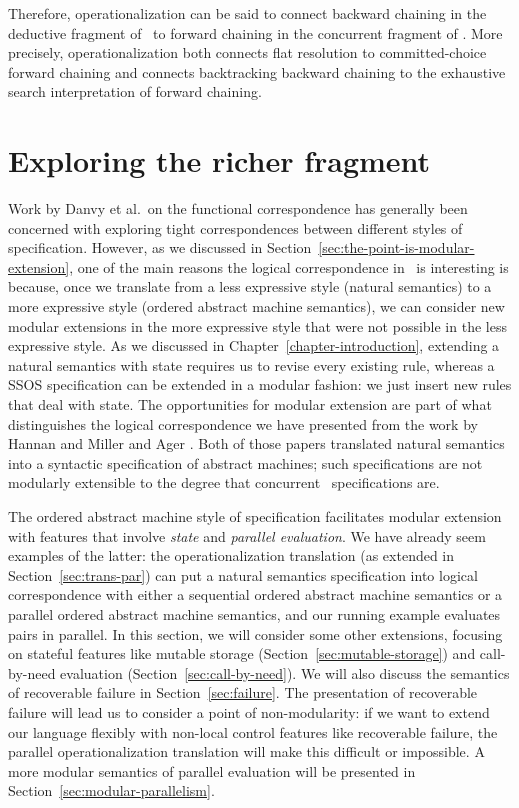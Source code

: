 Therefore, operationalization can be said to connect backward
chaining in the deductive fragment of \sls~to forward chaining in the
concurrent fragment of \sls. More precisely, operationalization both
connects flat resolution to committed-choice forward chaining and
connects backtracking backward chaining to the exhaustive search
interpretation of forward chaining.

\section{Exploring the richer fragment}
\label{sec:richer-ordered-abstract}

Work by Danvy et al.~on the functional correspondence has generally
been concerned with exploring tight correspondences between different
styles of specification. However, as we discussed in
Section~\ref{sec:the-point-is-modular-extension}, one of the main
reasons the logical correspondence in \sls~is interesting is because,
once we translate from a less expressive style (natural semantics) to
a more expressive style (ordered abstract machine semantics), we can
consider new modular extensions in the more expressive style that were
not possible in the less expressive style. As we discussed in
Chapter~\ref{chapter-introduction}, extending a natural semantics with
state requires us to revise every existing rule, whereas a SSOS
specification can be extended in a modular fashion: we just insert new
rules that deal with state. The opportunities for modular extension
are part of what distinguishes the logical correspondence we have
presented from the work by Hannan and Miller
\cite{hannan92operational} and Ager \cite{ager04natural}. Both of
those papers translated natural semantics into a syntactic
specification of abstract machines; such specifications are not
modularly extensible to the degree that concurrent \sls~specifications
are.

The ordered abstract machine style of specification facilitates
modular extension with features that involve {\it state} and {\it
  parallel evaluation}. We have already seem examples of the latter:
the operationalization translation (as extended in
Section~\ref{sec:trans-par}) can put a natural semantics specification
into logical correspondence with either a sequential ordered abstract
machine semantics or a parallel ordered abstract machine semantics,
and our running example evaluates pairs in parallel. In this section,
we will consider some other extensions, focusing on stateful features
like mutable storage (Section~\ref{sec:mutable-storage}) and
call-by-need evaluation (Section~\ref{sec:call-by-need}). We will also
discuss the semantics of recoverable failure in
Section~\ref{sec:failure}. The presentation of recoverable failure
will lead us to consider a point of non-modularity: if we want to
extend our language flexibly with non-local control features like
recoverable failure, the parallel operationalization translation will
make this difficult or impossible.  A more modular semantics of
parallel evaluation will be presented in
Section~\ref{sec:modular-parallelism}. 

